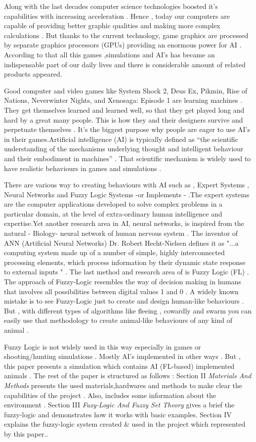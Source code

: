 Along with the last decades computer science technologies boosted it’s capabilities with increasing acceleration .  Hence , today our computers are capable of providing better graphic qualities and making more complex calculations . But thanks to the current technology, game graphics are processed by separate graphics processors (GPUs) providing an enormous power for AI \cite{gpu_negnev}. According to that  all this games ,simulations and AI’s has became an indispensable part of our daily lives and there is considerable amount of related products appeared.

Good computer and video games like System Shock 2, Deus Ex, Pikmin, Rise of Nations, Neverwinter Nights, and Xenosaga: Episode 1 are learning machines . They get themselves learned and learned well, so that they get played long and hard by a great many people. This is how they and their designers survive and perpetuate themselves \cite{challenge} . It's the biggest purpose why people are eager to use AI's in their games.Artificial intelligence (AI) is typically defined as “the scientific understanding of the mechanisms underlying thought and intelligent behaviour and their embodiment in machines” \cite{ai} . That scientific mechanism is widely used to have realistic behaviours in games and simulations . 

There are various way to creating behaviours with AI such as , Expert Systems , Neural Networks and Fuzzy Logic Systems -or Implements - .The expert systems are the computer applications developed to solve complex problems in a particular domain, at the level of extra-ordinary human intelligence and expertise.Yet another research area in AI, neural networks, is inspired from the natural - Biology-  neural network of human nervous system . The inventor of ANN (Artificial Neural Networks) Dr. Robert Hecht-Nielsen defines it as "...a computing system made up of a number of simple, highly interconnected processing elements, which process information by their dynamic state response to external inputs  " \cite{ann} . The last method and research area of  is Fuzzy Logic (FL) . The approach of Fuzzy-Logic resembles the way of decision making in humans that involves all  possibilities between digital values 1  and 0 . A widely known mistake is to see Fuzzy-Logic just to create and design human-like behaviours . But , with different types of algorithms like fleeing , cowardly and swarm you can easily use that methodology to create animal-like behaviours of any kind of animal .

Fuzzy Logic is not widely used in this way especially in games or shooting/hunting simulations . Mostly AI's implemented in other ways . But , this paper presents a simulation which contains AI (FL-based) implemented animals . The rest of the paper is structured as follows : Section II \textit{Materials And Methods} presents the used materials,hardwares and methods to make clear the capabilities of the project . Also, includes some information about the environment .   Section III \textit{Fuzy-Logic And Fuzzy Set Theory} gives a brief the fuzzy-logic and demonstrates how it works with basic examples. Section IV explains the fuzzy-logic system created \& used in the project which represented by this paper..